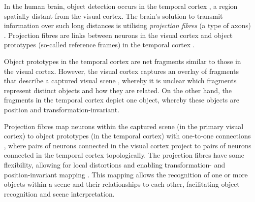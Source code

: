 In the human brain, object detection occurs in the temporal cortex \cite{miyashita_inferior_1993, conway_organization_2018}, a region spatially distant from the visual cortex.
The brain's solution to transmit information over such long distances is utilising \emph{projection fibres} (a type of axons) \cite{tanigawa_organization_2005, greig_molecular_2013}.
Projection fibres are links between neurons in the visual cortex and object prototypes (so-called reference frames) in the temporal cortex \cite{goodale_separate_1992}.

Object prototypes in the temporal cortex are net fragments similar to those in the visual cortex. However, the visual cortex captures an overlay of fragments that describe a captured visual scene \cite{von_der_malsburg_theory_2022}, whereby it is unclear which fragments represent distinct objects and how they are related.
On the other hand, the fragments in the temporal cortex depict one object, whereby these objects are position and transformation-invariant.

Projection fibres map neurons within the captured scene (in the primary visual cortex) to object prototypes (in the temporal cortex) with one-to-one connections , where pairs of neurons connected in the visual cortex project to pairs of neurons connected in the temporal cortex topologically. The projection fibres have some flexibility, allowing for local distortions and enabling transformation- and position-invariant mapping . This mapping allows the recognition of one or more objects within a scene and their relationships to each other, facilitating object recognition and scene interpretation.

